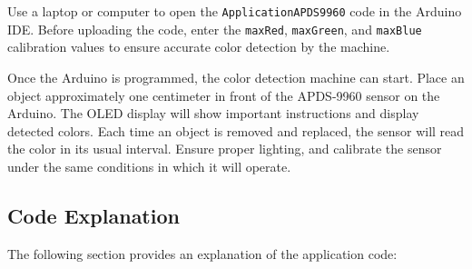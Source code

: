 \begin{center}
	\label{fig:OLEDCircuit}
\end{center}

 Use a laptop or computer to open the \texttt{ApplicationAPDS9960} code in the Arduino IDE. Before uploading the code, enter the \texttt{maxRed}, \texttt{maxGreen}, and \texttt{maxBlue} calibration values to ensure accurate color detection by the machine.

Once the Arduino is programmed, the color detection machine can start. Place an object approximately one centimeter in front of the APDS-9960 sensor on the Arduino. The OLED display will show important instructions and display detected colors. Each time an object is removed and replaced, the sensor will read the color in its usual interval. Ensure proper lighting, and calibrate the sensor under the same conditions in which it will operate.

\subsection{Code Explanation}
The following section provides an explanation of the application code:

